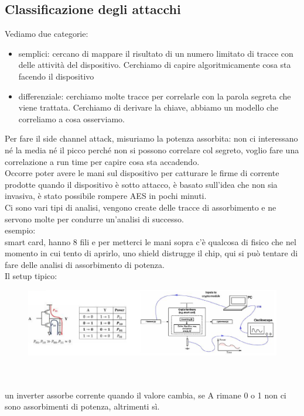\documentclass[oneside, 12pt]{extbook}
\begin{document}
\subsection{Classificazione degli attacchi} 
Vediamo due categorie:
\begin{itemize}
	\item semplici: cercano di mappare il risultato di un numero limitato di tracce con delle attività del dispositivo. Cerchiamo di capire algoritmicamente cosa sta facendo il dispositivo
	\item differenziale: cerchiamo molte tracce per correlarle con la parola segreta che viene trattata. Cerchiamo di derivare la chiave, abbiamo un modello che correliamo a cosa osserviamo.
\end{itemize}
Per fare il side channel attack, misuriamo la potenza assorbita: non ci interessano né la media né il picco perché non si possono correlare col segreto, voglio fare una correlazione a run time per capire cosa sta accadendo.
\\Occorre poter avere le mani sul dispositivo per catturare le firme di corrente prodotte quando il dispositivo è sotto attacco, è basato sull'idea che non sia invasiva, è stato possibile rompere AES in pochi minuti.
\\Ci sono vari tipi di analisi, vengono create delle tracce di assorbimento e ne servono molte per condurre un'analisi di successo.
\\esempio:
\\smart card, hanno 8 fili e per metterci le mani sopra c'è qualcosa di fisico che nel momento in cui tento di aprirlo, uno shield distrugge il chip, qui si può tentare di fare delle analisi di assorbimento di potenza.
\\Il setup tipico:\\
\begin{figure}[!h]
	\includegraphics[scale=0.4]{immagini/hardware/atk_setup.png}
\end{figure}
\\\\un inverter assorbe corrente quando il valore cambia, se A rimane 0 o 1 non ci sono assorbimenti di potenza, altrimenti sì.
\end{document}
